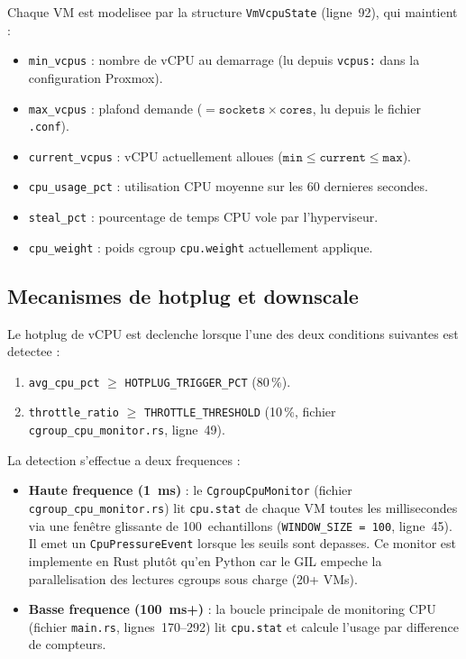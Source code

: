 Chaque VM est modelisee par la structure \texttt{VmVcpuState} (ligne~92), qui maintient :

\begin{itemize}
    \item \texttt{min\_vcpus} : nombre de vCPU au demarrage (lu depuis \texttt{vcpus:} dans la configuration Proxmox).
    \item \texttt{max\_vcpus} : plafond demande ($= \texttt{sockets} \times \texttt{cores}$, lu depuis le fichier \texttt{.conf}).
    \item \texttt{current\_vcpus} : vCPU actuellement alloues ($\texttt{min} \leq \texttt{current} \leq \texttt{max}$).
    \item \texttt{cpu\_usage\_pct} : utilisation CPU moyenne sur les 60 dernieres secondes.
    \item \texttt{steal\_pct} : pourcentage de temps CPU vole par l'hyperviseur.
    \item \texttt{cpu\_weight} : poids cgroup \texttt{cpu.weight} actuellement applique.
\end{itemize}

\subsection{Mecanismes de hotplug et downscale}
\label{subsec:hotplug-downscale}

Le hotplug de vCPU est declenche lorsque l'une des deux conditions suivantes est detectee :

\begin{enumerate}
    \item \texttt{avg\_cpu\_pct} $\geq$ \texttt{HOTPLUG\_TRIGGER\_PCT} (80\,\%).
    \item \texttt{throttle\_ratio} $\geq$ \texttt{THROTTLE\_THRESHOLD} (10\,\%, fichier \texttt{cgroup\_cpu\_monitor.rs}, ligne~49).
\end{enumerate}

La detection s'effectue a deux frequences :

\begin{itemize}
    \item \textbf{Haute frequence (1~ms)} : le \texttt{CgroupCpuMonitor} (fichier \texttt{cgroup\_cpu\_monitor.rs}) lit \texttt{cpu.stat} de chaque VM toutes les millisecondes via une fen\^etre glissante de 100~echantillons (\texttt{WINDOW\_SIZE = 100}, ligne~45). Il emet un \texttt{CpuPressureEvent} lorsque les seuils sont depasses. Ce monitor est implemente en Rust plut\^ot qu'en Python car le GIL empeche la parallelisation des lectures cgroups sous charge (20+ VMs).
    \item \textbf{Basse frequence (100~ms+)} : la boucle principale de monitoring CPU (fichier \texttt{main.rs}, lignes~170--292) lit \texttt{cpu.stat} et calcule l'usage par difference de compteurs.
\end{itemize}

